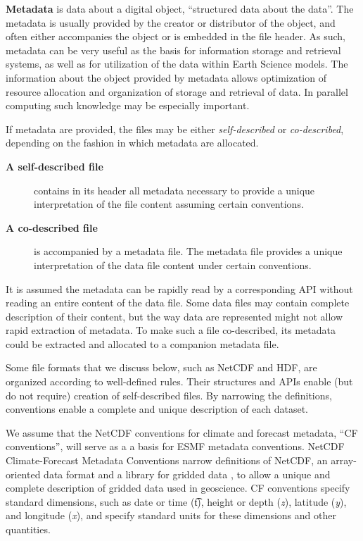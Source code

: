 {\bf Metadata} is data about a digital object, ``structured data about the 
data''. The metadata is usually provided by the creator or distributor of 
the object, and often either accompanies the object or is embedded in the 
file header. As such, metadata can be very useful as the basis for 
information storage and retrieval systems, as well as for utilization of the 
data within Earth Science models.
The information about the object provided by metadata allows optimization of  
resource allocation and organization of storage and retrieval of data. In 
parallel computing such knowledge may be especially important. 

If metadata are provided, the files may be either {\em self-described} or
{\em co-described}, depending on the fashion in which metadata are allocated.
\begin{description}
\item[\bf A self-described file] contains in its header all metadata 
necessary to provide a unique interpretation of the file content
assuming certain conventions.  
\item[\bf A co-described file] is accompanied by a metadata file. The
metadata file provides a unique interpretation of the data file content
under certain conventions. 
\end{description}
It is assumed the metadata can be rapidly read by a corresponding API without 
reading an entire content of the data file. Some data files may contain 
complete description of their content, but the way data are represented might 
not allow rapid extraction of metadata. To make such a file co-described, its 
metadata could be extracted and allocated to a companion metadata file.

Some file formats that we discuss below, such as NetCDF and HDF, are 
organized according to well-defined rules. Their structures and APIs enable 
(but do not require) creation of self-described files. By narrowing 
the definitions, conventions enable a complete and unique description of each 
dataset.

We assume that the NetCDF conventions for climate and forecast metadata, 
``CF conventions'', will serve as a a basis for ESMF metadata conventions.
 NetCDF Climate-Forecast Metadata Conventions
\cite{NetCDF_CF_v1_beta3} narrow definitions of NetCDF, an
array-oriented data format and a library for gridded data 
\cite{NetCDF3_UsersGuide_C}, to allow a unique and complete description
of gridded data used in geoscience. CF conventions specify standard 
dimensions, such as date or time ({\t t}), height or depth ({\it z}), 
latitude ({\it y}), and longitude ({\it x}), and specify standard
units for these dimensions and other quantities. 

